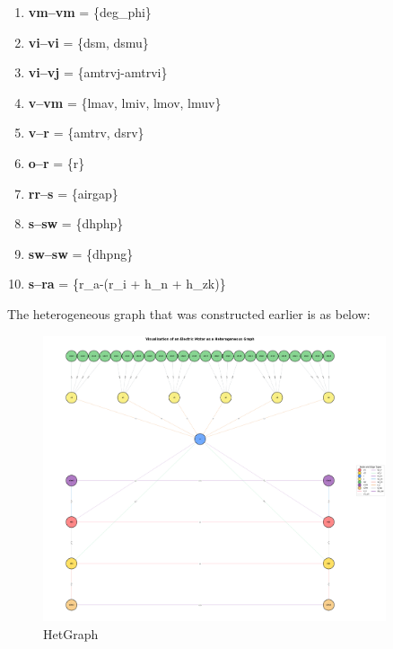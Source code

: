\documentclass{report} %
\begin{document}
\begin{enumerate}

    \item \textbf{vm--vm} = \{deg\_phi\}

    \item \textbf{vi--vi} = \{dsm, dsmu\}

    \item \textbf{vi--vj} = \{amtrvj-amtrvi\}

    \item \textbf{v--vm} = \{lmav, lmiv, lmov, lmuv\}

    \item \textbf{v--r} = \{amtrv, dsrv\}
    
    \item \textbf{o--r} = \{r\}

    \item \textbf{rr--s} = \{airgap\}

    \item \textbf{s--sw} = \{dhphp\}
    
    \item \textbf{sw--sw} = \{dhpng\}
    
    \item \textbf{s--ra} = \{r\_a-(r\_i + h\_n + h\_zk)\}
    
\end{enumerate}
The heterogeneous graph that was constructed earlier is as below:
\begin{figure}[H]
    \centering
    \includegraphics[width=0.9\textwidth]{./ReportImages/graph.png} 
    \caption{HetGraph}
    \label{fig:Graph}
\end{figure}
\end{document}
